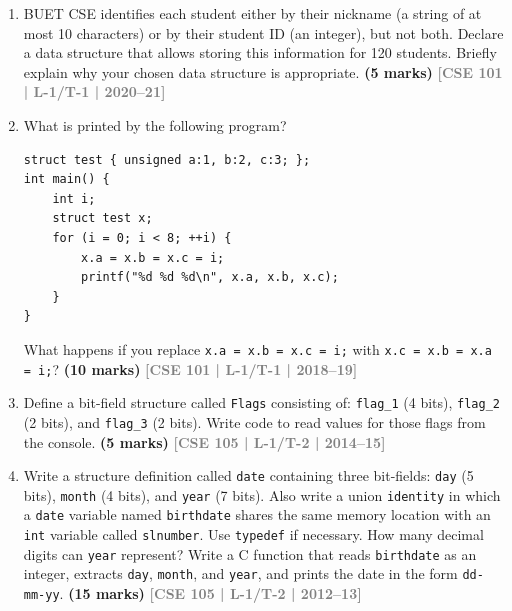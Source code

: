 \documentclass[12pt,a3paper]{article}
\newcommand{\yr}[1]{\hfill\textcolor{gray}{\small\textbf{[#1]}}}
\newcommand{\mk}[1]{\textcolor{orange!70!black}{\small\textbf{(#1 marks)}}}
\begin{document}
\begin{enumerate}
\begin{lstlisting}
union test {
    unsigned int value  : 3;
    unsigned int value2 : 4;
};
int main() {
    union test t;
    printf("Sizeof(t) : %d\n", sizeof(t));
    t.value2 = 5;
    printf("t.value : %d, t.value2 : %d\n", t.value, t.value2);
    t.value2 = 9;
    printf("t.value : %d, t.value2 : %d\n", t.value, t.value2);
    t.value2 = 13;
    printf("t.value : %d, t.value2 : %d\n", t.value, t.value2);
}
\end{lstlisting}
\mk{15} \yr{CSE 101 | L-1/T-1 | 2020--21}

\item BUET CSE identifies each student either by their nickname (a string of at most 10 characters) or by their student ID (an integer), but not both. Declare a data structure that allows storing this information for 120 students. Briefly explain why your chosen data structure is appropriate.
\mk{5} \yr{CSE 101 | L-1/T-1 | 2020--21}

\item What is printed by the following program?
 
\begin{lstlisting}
struct test { unsigned a:1, b:2, c:3; };
int main() {
    int i;
    struct test x;
    for (i = 0; i < 8; ++i) {
        x.a = x.b = x.c = i;
        printf("%d %d %d\n", x.a, x.b, x.c);
    }
}
\end{lstlisting}
What happens if you replace \texttt{x.a = x.b = x.c = i;} with \texttt{x.c = x.b = x.a = i;}?
\mk{10} \yr{CSE 101 | L-1/T-1 | 2018--19}

\item Define a bit-field structure called \texttt{Flags} consisting of: \texttt{flag\_1} (4 bits), \texttt{flag\_2} (2 bits), and \texttt{flag\_3} (2 bits). Write code to read values for those flags from the console.
\mk{5} \yr{CSE 105 | L-1/T-2 | 2014--15}


\item Write a structure definition called \texttt{date} containing three bit-fields: \texttt{day} (5 bits), \texttt{month} (4 bits), and \texttt{year} (7 bits). Also write a union \texttt{identity} in which a \texttt{date} variable named \texttt{birthdate} shares the same memory location with an \texttt{int} variable called \texttt{slnumber}. Use \texttt{typedef} if necessary. How many decimal digits can \texttt{year} represent? Write a C function that reads \texttt{birthdate} as an integer, extracts \texttt{day}, \texttt{month}, and \texttt{year}, and prints the date in the form \texttt{dd-mm-yy}.
\mk{15} \yr{CSE 105 | L-1/T-2 | 2012--13}


\end{enumerate}
\end{document}
